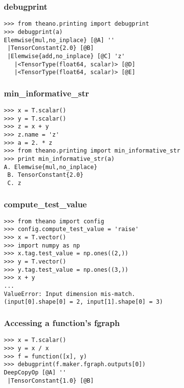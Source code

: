 \documentclass[utf8x,xcolor=pdftex,dvipsnames,table]{beamer}
\begin{document}
\begin{frame}[fragile]
  \frametitle{debugprint}

\begin{lstlisting}
>>> from theano.printing import debugprint
>>> debugprint(a)
Elemwise{mul,no_inplace} [@A] ''
 |TensorConstant{2.0} [@B]
 |Elemwise{add,no_inplace} [@C] 'z'
   |<TensorType(float64, scalar)> [@D]
   |<TensorType(float64, scalar)> [@E]
\end{lstlisting}
\end{frame}

\begin{frame}[fragile]
  \frametitle{min\_informative\_str}

\begin{lstlisting}
>>> x = T.scalar()
>>> y = T.scalar()
>>> z = x + y
>>> z.name = 'z'
>>> a = 2. * z
>>> from theano.printing import min_informative_str
>>> print min_informative_str(a)
A. Elemwise{mul,no_inplace}
 B. TensorConstant{2.0}
 C. z
\end{lstlisting}
\end{frame}

\begin{frame}[fragile]
  \frametitle{compute\_test\_value}

\begin{lstlisting}
>>> from theano import config
>>> config.compute_test_value = 'raise'
>>> x = T.vector()
>>> import numpy as np
>>> x.tag.test_value = np.ones((2,))
>>> y = T.vector()
>>> y.tag.test_value = np.ones((3,))
>>> x + y
...
ValueError: Input dimension mis-match.
(input[0].shape[0] = 2, input[1].shape[0] = 3)
\end{lstlisting}
\end{frame}

\begin{frame}[fragile]
  \frametitle{Accessing a function’s fgraph}

\begin{lstlisting}
>>> x = T.scalar()
>>> y = x / x
>>> f = function([x], y)
>>> debugprint(f.maker.fgraph.outputs[0])
DeepCopyOp [@A] ''
 |TensorConstant{1.0} [@B]
\end{lstlisting}
\end{frame}
\end{document}
